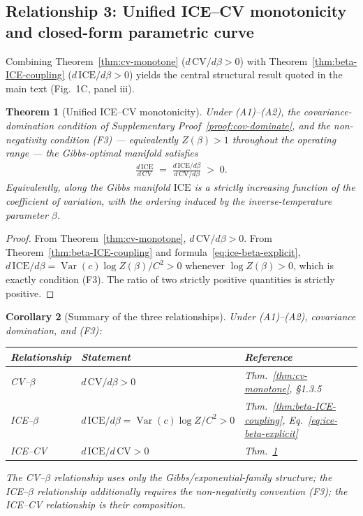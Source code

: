 \documentclass[11pt]{article}
\DeclareMathOperator{\Var}{Var}
\newtheorem{theorem}{Theorem}[section]
\newtheorem{corollary}[theorem]{Corollary}
\theoremstyle{remark}
\theoremstyle{definition}
\begin{document}
\subsection{Relationship 3: Unified ICE--CV monotonicity and closed-form parametric curve}
\label{sec:ice-cv-unified}

Combining Theorem~\ref{thm:cv-monotone} ($d\,\mathrm{CV}/d\beta>0$) with Theorem~\ref{thm:beta-ICE-coupling} ($d\,\mathrm{ICE}/d\beta>0$) yields the central structural result quoted in the main text (Fig.~1C, panel iii).

\begin{theorem}[Unified ICE--CV monotonicity]
\label{thm:ice-cv-monotone}
Under (A1)--(A2), the covariance-domination condition of Supplementary Proof~\ref{proof:cov-dominate}, and the non-negativity condition (F3) --- equivalently $Z(\beta)>1$ throughout the operating range --- the Gibbs-optimal manifold satisfies
\begin{align}
\frac{d\,\mathrm{ICE}}{d\,\mathrm{CV}}
\;=\;
\frac{d\,\mathrm{ICE}/d\beta}{d\,\mathrm{CV}/d\beta}
\;>\;0.
\end{align}
Equivalently, along the Gibbs manifold $\mathrm{ICE}$ is a strictly increasing function of the coefficient of variation, with the ordering induced by the inverse-temperature parameter $\beta$.
\end{theorem}

\begin{proof}
From Theorem~\ref{thm:cv-monotone}, $d\,\mathrm{CV}/d\beta>0$.  From Theorem~\ref{thm:beta-ICE-coupling} and formula~\eqref{eq:ice-beta-explicit}, $d\,\mathrm{ICE}/d\beta = \Var(c)\log Z(\beta)/C^2>0$ whenever $\log Z(\beta)>0$, which is exactly condition (F3).  The ratio of two strictly positive quantities is strictly positive.
\end{proof}

\begin{corollary}[Summary of the three relationships]
Under (A1)--(A2), covariance domination, and (F3):
\begin{center}
\begin{tabular}{@{}lll@{}}
\toprule
Relationship & Statement & Reference \\
\midrule
CV--$\beta$  & $d\,\mathrm{CV}/d\beta>0$ & Thm.~\ref{thm:cv-monotone}, \S1.3.5 \\
ICE--$\beta$ & $d\,\mathrm{ICE}/d\beta=\Var(c)\log Z/C^2>0$ & Thm.~\ref{thm:beta-ICE-coupling}, Eq.~\eqref{eq:ice-beta-explicit} \\
ICE--CV     & $d\,\mathrm{ICE}/d\,\mathrm{CV}>0$ & Thm.~\ref{thm:ice-cv-monotone} \\
\bottomrule
\end{tabular}
\end{center}
The CV--$\beta$ relationship uses only the Gibbs/exponential-family structure; the ICE--$\beta$ relationship additionally requires the non-negativity convention (F3); the ICE--CV relationship is their composition.
\end{corollary}
\end{document}
